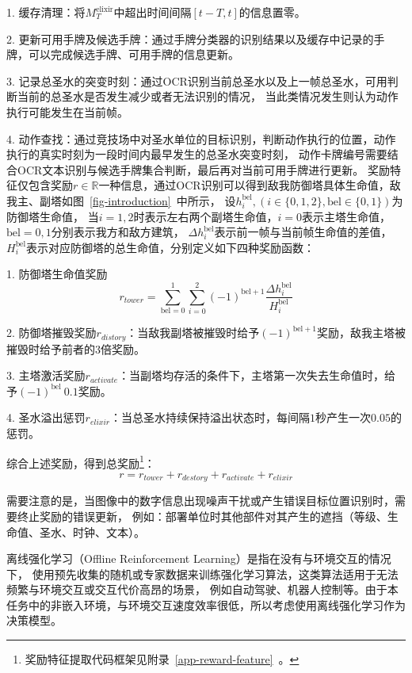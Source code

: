 1. 缓存清理：将$M_{T}^{\text{elixir}}$中超出时间间隔$[t-T,t]$的信息置零。

2. 更新可用手牌及候选手牌：通过手牌分类器的识别结果以及缓存中记录的手牌，可以完成候选手牌、可用手牌的信息更新。

3. 记录总圣水的突变时刻：通过OCR识别当前总圣水以及上一帧总圣水，可用判断当前的总圣水是否发生减少或者无法识别的情况，
当此类情况发生则认为动作执行可能发生在当前帧。

4. 动作查找：通过竞技场中对圣水单位的目标识别，判断动作执行的位置，动作执行的真实时刻为一段时间内最早发生的总圣水突变时刻，
动作卡牌编号需要结合OCR文本识别与候选手牌集合判断，最后再对当前可用手牌进行更新。
奖励特征仅包含奖励$r\in\mathbb{R}$一种信息，通过OCR识别可以得到敌我防御塔具体生命值，敌我主、副塔如图~\ref{fig-introduction}~中所示，
设$h_{i}^{\text{bel}}, (i\in\{0,1,2\},\text{bel}\in\{0,1\})$为防御塔生命值，
当$i=1,2$时表示左右两个副塔生命值，$i=0$表示主塔生命值，$\text{bel}=0,1$分别表示我方和敌方建筑，
$\Delta h_{i}^{\text{bel}}$表示前一帧与当前帧生命值的差值，$H_{i}^{\text{bel}}$表示对应防御塔的总生命值，分别定义如下四种奖励函数：

1. 防御塔生命值奖励
\begin{equation}
  r_{tower} = \sum_{\text{bel}=0}^1\sum_{i=0}^2(-1)^{\text{bel}+1}\frac{\Delta h_{i}^{\text{bel}}}{H_{i}^{\text{bel}}}
\end{equation}

2. 防御塔摧毁奖励$r_{distory}$：当敌我副塔被摧毁时给予$(-1)^{\text{bel}+1}$奖励，敌我主塔被摧毁时给予前者的$3$倍奖励。

3. 主塔激活奖励$r_{activate}$：当副塔均存活的条件下，主塔第一次失去生命值时，给予$(-1)^{\text{bel}}~0.1$奖励。

4. 圣水溢出惩罚$r_{elixir}$：当总圣水持续保持溢出状态时，每间隔$1$秒产生一次$0.05$的惩罚。

综合上述奖励，得到总奖励\footnote{奖励特征提取代码框架见附录~\ref{app-reward-feature}~。}：
\begin{equation}\label{eq-reward}
  r = r_{tower} + r_{destory} + r_{activate} + r_{elixir}
\end{equation}

需要注意的是，当图像中的数字信息出现噪声干扰或产生错误目标位置识别时，需要终止奖励的错误更新，
例如：部署单位时其他部件对其产生的遮挡（等级、生命值、圣水、时钟、文本）。

\label{sec-model}
\label{sec-offline-rl}
离线强化学习（Offline Reinforcement Learning）是指在没有与环境交互的情况下，
使用预先收集的随机或专家数据来训练强化学习算法，这类算法适用于无法频繁与环境交互或交互代价高昂的场景，
例如自动驾驶、机器人控制等。由于本任务中的非嵌入环境，与环境交互速度效率很低，所以考虑使用离线强化学习作为决策模型。

